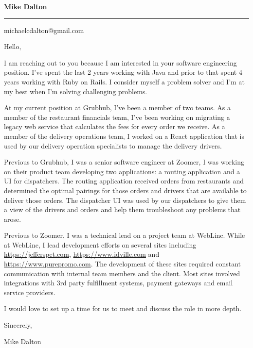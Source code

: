 \documentclass{letter} %
\begin{document}

\begin{flushleft}
{\large\bf Mike Dalton}
\end{flushleft}
\medskip\hrule height 1pt
\begin{flushright}
\hfill michaelcdalton@gmail.com \\
\end{flushright}

Hello,

I am reaching out to you because I am interested in your software engineering position. I've spent the last 2 years working with Java and prior to that spent 4 years working with Ruby on Rails. I consider myself a problem solver and I'm at my best when I'm solving challenging problems.

At my current position at Grubhub, I've been a member of two teams. As a member of the restaurant financials team, I've been working on migrating a legacy web service that calculates the fees for every order we receive. As a member of the delivery operations team, I worked on a React application that is used by our delivery operation specialists to manage the delivery drivers.

Previous to Grubhub, I was a senior software engineer at Zoomer, I was working on their product team developing two applications: a routing application and a UI for dispatchers. The routing application received orders from restaurants and determined the optimal pairings for those orders and drivers that are available to deliver those orders. The dispatcher UI was used by our dispatchers to give them a view of the drivers and orders and help them troubleshoot any problems that arose.

Previous to Zoomer, I was a technical lead on a project team at WebLinc. While at WebLinc, I lead development efforts on several sites including \url{https://jefferspet.com}, \url{https://www.idville.com} and \url{https://www.purepromo.com}. The development of these sites required constant communication with internal team members and the client. Most sites involved integrations with 3rd party fulfillment systems, payment gateways and email service providers.

I would love to set up a time for us to meet and discuss the role in more depth.

Sincerely,

Mike Dalton
\end{document}
